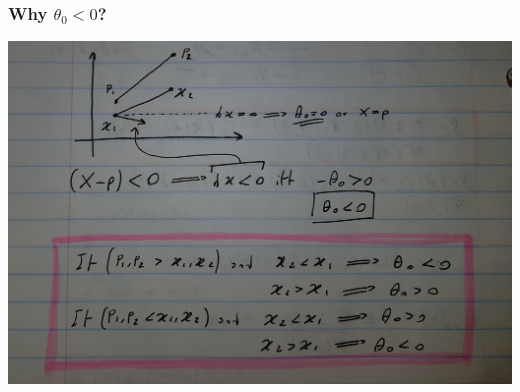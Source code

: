 \documentclass[aspectratio=169]{beamer}\usepackage[utf8]{inputenc}
\begin{document}

\begin{frame}\frametitle{Why $\theta_0<0$?}

\includegraphics[width=0.7\columnwidth]{20200422_205641.jpg}


\end{frame}
\end{document}
